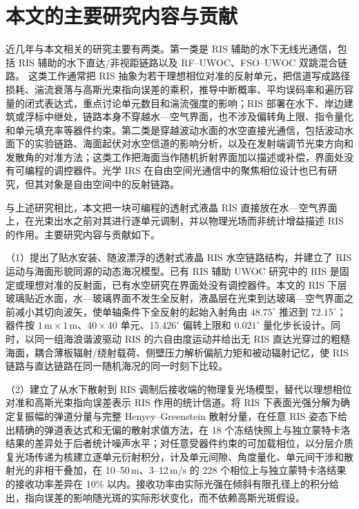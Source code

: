 \section{本文的主要研究内容与贡献}

近几年与本文相关的研究主要有两类。第一类是 RIS 辅助的水下无线光通信，包括 RIS 辅助的水下直达/非视距链路以及 RF--UWOC、FSO--UWOC 双跳混合链路。
这类工作通常把 RIS 抽象为若干理想相位对准的反射单元，把信道写成路径损耗、湍流衰落与高斯光束指向误差的乘积，推导中断概率、平均误码率和遍历容量的闭式表达式，重点讨论单元数目和湍流强度的影响；RIS 部署在水下、岸边建筑或浮标中继处，链路本身不穿越水—空气界面，也不涉及偏转角上限、指令量化和单元填充率等器件约束。第二类是穿越波动水面的水空直接光通信，包括波动水面下的实验链路、海面起伏对水空信道的影响分析，以及在发射端调节光束方向和发散角的对准方法；这类工作把海面当作随机折射界面加以描述或补偿，界面处没有可编程的调控器件。光学 IRS 在自由空间光通信中的聚焦相位设计也已有研究，但其对象是自由空间中的反射链路。

与上述研究相比，本文把一块可编程的透射式液晶 RIS 直接放在水—空气界面上，在光束出水之前对其进行逐单元调制，并以物理光场而非统计增益描述 RIS 的作用。主要研究内容与贡献如下。

（1）提出了贴水安装、随波漂浮的透射式液晶 RIS 水空链路结构，并建立了 RIS 运动与海面形貌同源的动态海况模型。已有 RIS 辅助 UWOC 研究中的 RIS 是固定或理想对准的反射面，已有水空研究在界面处没有调控器件。本文的 RIS 下层玻璃贴近水面，水—玻璃界面不发生全反射，液晶层在光束到达玻璃—空气界面之前减小其切向波矢，使单轴条件下全反射的起始入射角由 $48.75^\circ$ 推迟到 $72.15^\circ$；器件按 $1\,\mathrm m\times1\,\mathrm m$、$40\times40$ 单元、$15.426^\circ$ 偏转上限和 $0.021^\circ$ 量化步长设计。同时，以同一组海浪谐波驱动 RIS 的六自由度运动并给出无 RIS 直达光穿过的粗糙海面，耦合薄板辐射/绕射载荷、侧壁压力解析偏航力矩和被动辐射记忆，使 RIS 链路与直达链路在同一随机海况的同一时刻下比较。

（2）建立了从水下散射到 RIS 调制后接收端的物理复光场模型，替代以理想相位对准和高斯光束指向误差表示 RIS 作用的统计信道。将 RIS 下表面光强分解为确定复振幅的弹道分量与完整 Henyey--Greenstein 散射分量，在任意 RIS 姿态下给出精确的弹道表达式和无偏的散射求值方法，在 18 个冻结快照上与独立蒙特卡洛结果的差异处于后者统计噪声水平；对任意受器件约束的可加载相位，以分层介质复光场传递为核建立逐单元衍射积分，计及单元间隙、角度量化、单元间干涉和散射光的非相干叠加，在 10--50\,m、3--12\,m/s 的 228 个相位上与独立蒙特卡洛结果的接收功率差异在 10\% 以内。接收功率由实际光强在倾斜有限孔径上的积分给出，指向误差的影响随光斑的实际形状变化，而不依赖高斯光斑假设。

